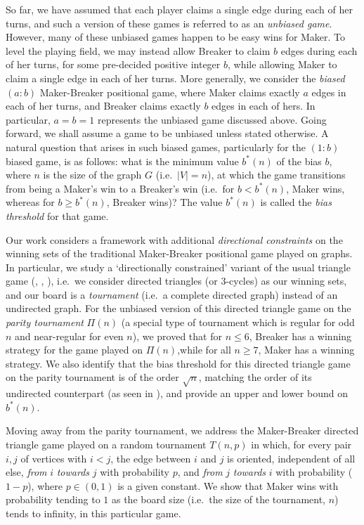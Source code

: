 \documentclass{article}
\theoremstyle{definition}
\theoremstyle{plain}
\theoremstyle{remark}
\theoremstyle{definition}
\begin{document}
So far, we have assumed that each player claims a single edge during each of her turns, and such a version of these games is referred to as an \emph{unbiased game}. However, many of these unbiased games happen to be easy wins for Maker. To level the playing field, we may instead allow Breaker to claim $b$ edges during each of her turns, for some pre-decided positive integer $b$, while allowing Maker to claim a single edge in each of her turns. More generally, we consider the \emph{biased} $(a:b)$ Maker-Breaker positional game, where Maker claims exactly $a$ edges in each of her turns, and Breaker claims exactly $b$ edges in each of hers. In particular, $a=b=1$ represents the unbiased game discussed above. Going forward, we shall assume a game to be unbiased unless stated otherwise. A natural question that arises in such biased games, particularly for the $(1:b)$  biased game, is as follows: what is the minimum value $b^{*}(n)$ of the bias $b$, where $n$ is the size of the graph $G$ (i.e.\ $|V|=n$), at which the game transitions from being a Maker's win to a Breaker's win (i.e.\ for $b < b^{*}(n)$, Maker wins, whereas for $b\ge b^{*}(n)$, Breaker wins)? The value $b^*(n)$ is called the \emph{bias threshold} for that game. 

Our work considers a framework with additional \emph{directional constraints} on the winning sets of the traditional Maker-Breaker positional game played on graphs. In particular, we study a `directionally constrained' variant of the usual triangle game (\cite{chvatal1978biased}, \cite{balogh2011chvatal}, \cite{glazik2022new}), i.e.\ we consider directed triangles (or $3$-cycles) as our winning sets, and our board is a \emph{tournament} (i.e.\ a complete directed graph) instead of an undirected graph. For the unbiased version of this directed triangle game on the \emph{parity tournament} $\Pi(n)$ (a special type of tournament which is regular for odd $n$ and near-regular for even $n$), we proved that for $n\le 6$, Breaker has a winning strategy for the game played on $\Pi(n)$,while for all $n \ge 7$, Maker has a winning strategy. We also identify that the bias threshold for this directed triangle game on the parity tournament is of the order $\sqrt{n}$, matching the order of its undirected counterpart (as seen in \cite{chvatal1978biased}), and provide an upper and lower bound on $b^*(n)$.

Moving away from the parity tournament, we address the Maker-Breaker directed triangle game played on a random tournament $T(n,p)$ in which, for every pair $i,j$ of vertices with $i<j$, the edge between $i$ and $j$ is oriented, independent of all else, \emph{from} $i$ \emph{towards} $j$ with probability $p$, and \emph{from} $j$ \emph{towards} $i$ with probability ($1-p$), where $p\in (0,1)$ is a given constant. We show that Maker wins with probability tending to $1$ as the board size (i.e.\ the size of the tournament, $n$) tends to infinity, in this particular game.
\end{document}
